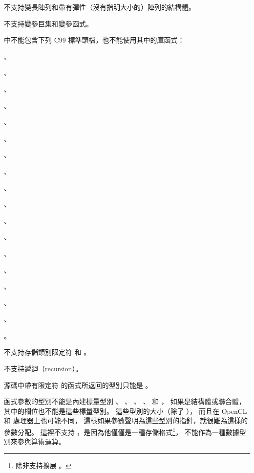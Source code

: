不支持變長陣列和帶有彈性（沒有指明大小的）陣列的結構體。
\stopitem

\startitem
不支持變參巨集和變參函式。
\stopitem

\startitem
{}中不能包含下列 C99 標準頭檔，也不能使用其中的庫函式：
\startigBase
\item {}、
\item {}、
\item {}、
\item {}、
\item {}、
\item {}、
\item {}、
\item {}、
\item {}、
\item {}、
\item {}、
\item {}、
\item {}、
\item {}、
\item {}、
\item {}、
\item {}、
\item {}
\item {}。
\stopigBase
\stopitem

\startitem
不支持存儲類別限定符  和 。
\stopitem


\startitem
不支持遞迴（recursion）。
\stopitem

\startitem
源碼中帶有限定符  的函式所返回的型別只能是 。
\stopitem

\startitem
{}函式參數的型別不能是內建標量型別
 、 、 、 、
  和 ，
如果是結構體或聯合體，其中的欄位也不能是這些標量型別。
這些型別的大小（除了 ），
而且在 OpenCL  和  處理器上也可能不同，
這樣如果參數聲明為這些型別的指針，就很難為這樣的參數分配。
這裡不支持 ，是因為他僅僅是一種存儲格式\footnote{
除非支持擴展 。}，
不能作為一種數據型別來參與算術運算。
\stopitem

